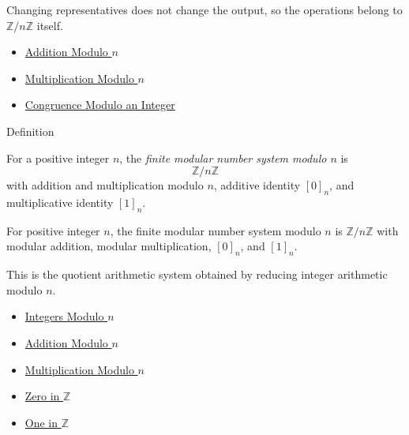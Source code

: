 \begin{remark*}[Interpretation]
Changing representatives does not change the output, so the operations
belong to \(\mathbb{Z}/n\mathbb{Z}\) itself.
\end{remark*}

\begin{dependencies}
\begin{itemize}
\item \hyperref[def:addition-modulo-n]{Addition Modulo \(n\)}
  \item \hyperref[def:multiplication-modulo-n]{Multiplication Modulo \(n\)}
  \item \hyperref[def:congruence-modulo-integer]{Congruence Modulo an Integer}
\end{itemize}
\end{dependencies}

\begin{definitionbox}{Definition}
\begin{definition}
\label{def:finite-modular-number-system}
For a positive integer \(n\), the \emph{finite modular number system modulo
\(n\)} is
\[
\mathbb{Z}/n\mathbb{Z}
\]
with addition and multiplication modulo \(n\), additive identity \([0]_n\),
and multiplicative identity \([1]_n\).
\end{definition}
\end{definitionbox}

\begin{remark*}
For positive integer \(n\), the finite modular number system modulo \(n\) is
\(\mathbb{Z}/n\mathbb{Z}\) with modular addition, modular multiplication,
\([0]_n\), and \([1]_n\).
\end{remark*}

\begin{remark*}[Interpretation]
This is the quotient arithmetic system obtained by reducing integer
arithmetic modulo \(n\).
\end{remark*}

\begin{dependencies}
\begin{itemize}
  \item \hyperref[def:integers-modulo-n]{Integers Modulo \(n\)}
  \item \hyperref[def:addition-modulo-n]{Addition Modulo \(n\)}
  \item \hyperref[def:multiplication-modulo-n]{Multiplication Modulo \(n\)}
  \item \hyperref[def:zero-in-z]{Zero in \(\mathbb{Z}\)}
  \item \hyperref[def:one-in-z]{One in \(\mathbb{Z}\)}
\end{itemize}
\end{dependencies}

